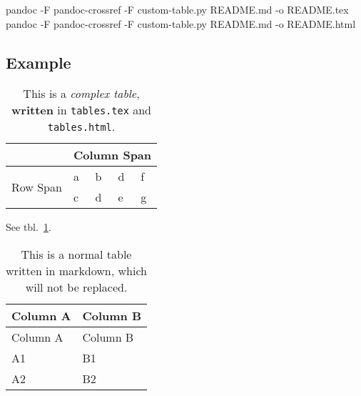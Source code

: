 \documentclass[
]{article}
\newenvironment{Shaded}{}{}
\newcommand{\AttributeTok}[1]{\textcolor[rgb]{0.49,0.56,0.16}{#1}}
\newcommand{\ExtensionTok}[1]{#1}
\newcommand{\NormalTok}[1]{#1}
\begin{document}
\begin{Shaded}
\begin{Highlighting}[]
\ExtensionTok{pandoc} \AttributeTok{{-}F}\NormalTok{ pandoc{-}crossref }\AttributeTok{{-}F}\NormalTok{ custom{-}table.py README.md }\AttributeTok{{-}o}\NormalTok{ README.tex}
\ExtensionTok{pandoc} \AttributeTok{{-}F}\NormalTok{ pandoc{-}crossref }\AttributeTok{{-}F}\NormalTok{ custom{-}table.py README.md }\AttributeTok{{-}o}\NormalTok{ README.html}
\end{Highlighting}
\end{Shaded}

\hypertarget{example}{%
\subsection{Example}\label{example}}

\begin{table}[]
    \caption{\label{tbl:custom-table}This is a \emph{complex table}, \textbf{written} in \texttt{tables.tex} and \texttt{tables.html}.}
\begin{tabular}{lllll}
    \hline
    \textbf{} & \multicolumn{4}{l}{Column Span} \\ \hline
    \multirow{2}{*}{Row Span} & a & b & d & f \\
     & c & d & e & g \\ \hline
    \end{tabular}
\end{table}

See tbl.~\ref{tbl:custom-table}.

\hypertarget{tbl:normal-table}{}
\begin{longtable}[]{@{}ll@{}}
\caption{\label{tbl:normal-table}This is a normal table written in
markdown, which will not be replaced.}\tabularnewline
\toprule
Column A & Column B \\
\midrule
\endfirsthead
\toprule
Column A & Column B \\
\midrule
\endhead
A1 & B1 \\
A2 & B2 \\
\bottomrule
\end{longtable}
\end{document}
